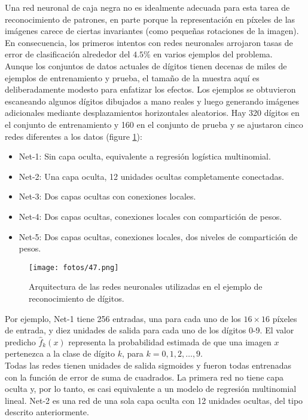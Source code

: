 Una red neuronal de caja negra no es idealmente adecuada para esta tarea de reconocimiento de patrones, en parte porque la representación en píxeles de las imágenes carece de ciertas invariantes (como pequeñas rotaciones de la imagen). En consecuencia, los primeros intentos con redes neuronales arrojaron tasas de error de clasificación alrededor del $4.5$\% en varios ejemplos del problema. \\

Aunque los conjuntos de datos actuales de dígitos tienen decenas de miles de ejemplos de entrenamiento y prueba, el tamaño de la muestra aquí es deliberadamente modesto para enfatizar los efectos. Los ejemplos se obtuvieron escaneando algunos dígitos dibujados a mano reales y luego generando imágenes adicionales mediante desplazamientos horizontales aleatorios. Hay 320 dígitos en el conjunto de entrenamiento y 160 en el conjunto de prueba y se ajustaron cinco redes diferentes a los datos (figure \ref{fig:7.8}):
\begin{itemize}
\item Net-1: Sin capa oculta, equivalente a regresión logística multinomial.
\item Net-2: Una capa oculta, 12 unidades ocultas completamente conectadas.
\item Net-3: Dos capas ocultas con conexiones locales.
\item Net-4: Dos capas ocultas, conexiones locales con compartición de pesos.
\item Net-5: Dos capas ocultas, conexiones locales, dos niveles de compartición de pesos.
\end{itemize}

\begin{figure}[h]
\centering
\texttt{[image: fotos/47.png]}
\caption{Arquitectura de las redes neuronales utilizadas en el ejemplo de reconocimiento de dígitos.}
\label{fig:7.8}
\end{figure}

Por ejemplo, Net-1 tiene 256 entradas, una para cada uno de los $16 \times 16$ píxeles de entrada, y diez unidades de salida para cada uno de los dígitos 0-9. El valor predicho $\hat{f}_k(x)$ representa la probabilidad estimada de que una imagen $x$ pertenezca a la clase de dígito $k$, para $k = 0, 1, 2, \dots, 9$. \\

Todas las redes tienen unidades de salida sigmoides y fueron todas entrenadas con la función de error de suma de cuadrados. La primera red no tiene capa oculta y, por lo tanto, es casi equivalente a un modelo de regresión multinomial lineal. Net-2 es una red de una sola capa oculta con 12 unidades ocultas, del tipo descrito anteriormente.

